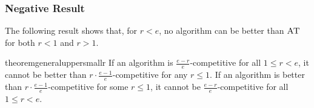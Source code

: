 \documentclass[a4paper,UKenglish,cleveref, autoref, thm-restate]{lipics-v2021}
\newcommand{\ADB}{\ensuremath{\operatorname{\textsc{AT}}}\xspace}
\begin{document}
\subsubsection{Negative Result}

The following result shows that, for $r<e$, no algorithm can be better
than \ADB for both $r < 1$ and
$r > 1$.

\begin{restatable}{theorem}{generaluppersmallr}
  \label{thm:generaluppersmallr}
  If an algorithm is $\frac{e-r}{e}$-competitive for all $1 \leq r<e$,
  it cannot be better than $r \cdot \frac{e-1}{e}$-competitive for any
  $r \leq 1$.
  If an algorithm is better than $r \cdot \frac{e-1}{e}$-competitive for some
  $r \leq 1$, it cannot be $\frac{e-r}{e}$-competitive for all $1 \leq r<e$.
\end{restatable}
\end{document}
